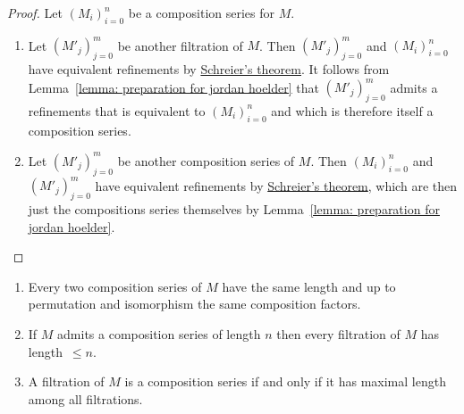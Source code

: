 \begin{proof}
  Let $(M_i)_{i=0}^n$ be a composition series for $M$.
  \begin{enumerate}
    \item
      Let $(M'_j)_{j=0}^m$ be another filtration of $M$.
      Then $(M'_j)_{j=0}^m$ and $(M_i)_{i=0}^n$ have equivalent refinements by \hyperref[theorem: schreiers theorem]{Schreier’s theorem}.
      It follows from Lemma~\ref{lemma: preparation for jordan hoelder} that $(M'_j)_{j=0}^m$ admits a refinements that is equivalent to $(M_i)_{i=0}^n$ and which is therefore itself a composition series.
    \item
      Let $(M'_j)_{j=0}^m$ be another composition series of $M$.
      Then $(M_i)_{i=0}^n$ and $(M'_j)_{j=0}^m$ have equivalent refinements by \hyperref[theorem: schreiers theorem]{Schreier’s theorem}, which are then just the compositions series themselves by Lemma~\ref{lemma: preparation for jordan hoelder}.
    \qedhere
  \end{enumerate}
\end{proof}


\begin{corollary}
  \label{corollary: consequences of jordan hoelder}
  \leavevmode
  \begin{enumerate}
    \item
      \label{enumerate: composition series have same length and factors}
      Every two composition series of $M$ have the same length and up to permutation and isomorphism the same composition factors.
    \item
      \label{enumerate: filtration maximal length of composition series}
      If $M$ admits a composition series of length $n$ then every filtration of $M$ has length~$\leq n$.
    \item
      A filtration of $M$ is a composition series if and only if it has maximal length among all filtrations.
  \end{enumerate}
\end{corollary}


